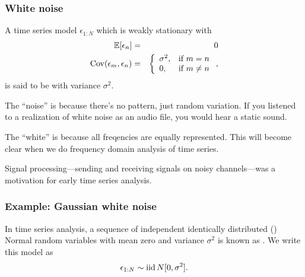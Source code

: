 \begin{frame}[fragile]
\frametitle{White noise}

A time series model $\epsilon_{1:N}$ which is weakly stationary with 
\begin{eqnarray} \nonumber
\mathbb{E}[\epsilon_n]&=& 0 
\\ 
\nonumber
\mathrm{Cov}(\epsilon_m,\epsilon_n) &=& \left\{\begin{array}{ll}
  \sigma^2, & \mbox{if $m=n$} \\
   0, & \mbox{if $m\neq n$} \end{array}\right. ,
\end{eqnarray}
is said to be  with variance $\sigma^2$.
\bi
\item The ``noise'' is because there's no pattern, just random variation. If you listened to a realization of white noise as an audio file, you would hear a static sound.

\item The ``white'' is because all freqencies are equally represented. This will become clear when we do frequency domain analysis of time series.

\item Signal processing---sending and receiving signals on noisy channels---was a motivation for early time series analysis.

\ei

\end{frame} 


\begin{frame}[fragile]
\frametitle{Example: Gaussian white noise}

In time series analysis, a sequence of independent identically distributed (\iid) Normal random variables with mean zero and variance $\sigma^2$ is known as . We write this model as
\[
\nonumber 
\epsilon_{1:N} \sim \mathrm{iid} \, N[0,\sigma^2].
\]
 
\end{frame} 

